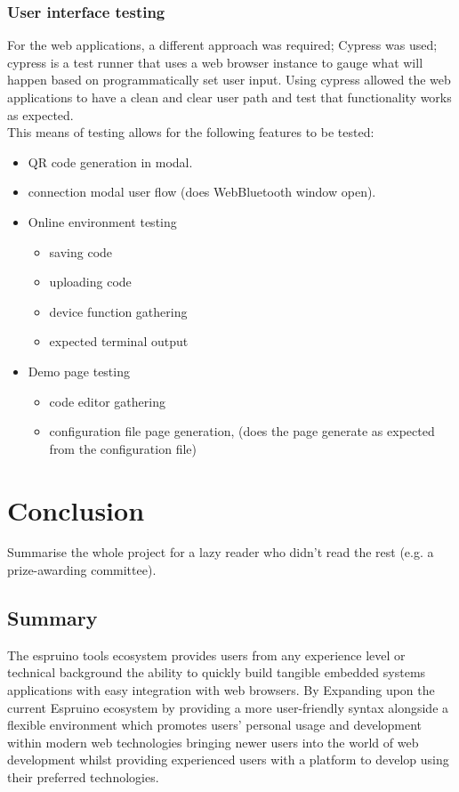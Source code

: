 \documentclass{l4proj}
\begin{document}
\subsection{User interface testing}
For the web applications, a different approach was required; Cypress was used; cypress is a test runner that uses a web browser instance to gauge what will happen based on programmatically set user input. Using cypress allowed the web applications to have a clean and clear user path and test that functionality works as expected.
\\
This means of testing allows for the following features to be tested:
\begin{itemize}
    \item QR code generation in modal.
    \item connection modal user flow (does WebBluetooth window open).
    \item Online environment testing 
    \begin{itemize}
        \item saving code
        \item uploading code
        \item device function gathering
        \item expected terminal output
    \end{itemize}
    \item Demo page testing
    \begin{itemize}
        \item code editor gathering
        \item configuration file page generation, (does the page generate as expected from the configuration file)
    \end{itemize}
\end{itemize}


\chapter{Conclusion}    
Summarise the whole project for a lazy reader who didn't read the rest (e.g. a prize-awarding committee).
\section{Summary}
The espruino tools ecosystem provides users from any experience level or technical background the ability to quickly build tangible embedded systems applications with easy integration with web browsers. By Expanding upon the current Espruino ecosystem by providing a more user-friendly syntax alongside a flexible environment which promotes users' personal usage and development within modern web technologies bringing newer users into the world of web development whilst providing experienced users with a platform to develop using their preferred technologies.
\end{document}
